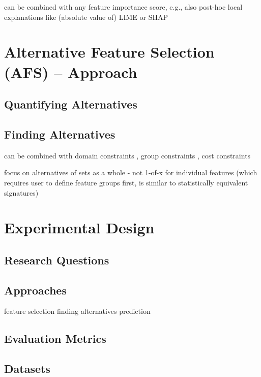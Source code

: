 \documentclass{article}
\begin{document}
can be combined with any feature importance score, e.g., also post-hoc local explanations like (absolute value of) LIME \cite{ribeiro2016should} or SHAP \cite{lundberg2017unified}

\section{Alternative Feature Selection (AFS) -- Approach}
\label{sec:approach}

\subsection{Quantifying Alternatives}

\subsection{Finding Alternatives}

can be combined with domain constraints \cite{groves2015toward}, group constraints \cite{yuan2006model}, cost constraints \cite{paclik2002feature}

focus on alternatives of sets as a whole - not 1-of-x for individual features (which requires user to define feature groups first, is similar to statistically equivalent signatures)

\section{Experimental Design}
\label{sec:experimental-design}

\subsection{Research Questions}

\subsection{Approaches}

feature selection
finding alternatives
prediction

\subsection{Evaluation Metrics}

\subsection{Datasets}
\end{document}

